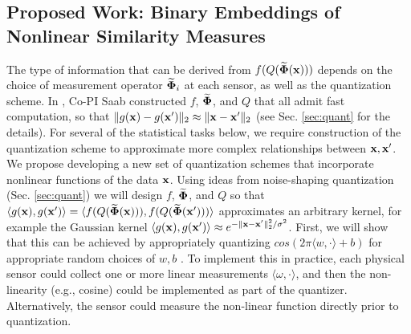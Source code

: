 \subsection{Proposed Work: Binary Embeddings of Nonlinear Similarity Measures}
The type of information that can be derived from $f(Q(\widetilde{\mathbf{\Phi}} (\mathbf{x})))$ depends on
the choice of measurement operator $\widetilde{\mathbf{\Phi}}_i$ at each sensor, as well as
the quantization scheme.  In \cite{huynh2018fast}, Co-PI Saab constructed $f$, $\widetilde{\mathbf{\Phi}}$, and $Q$ that all admit fast computation, so that 
$\|g(\mathbf{x}) - g(\mathbf{x}')\|_2\approx \|\mathbf{x}-\mathbf{x}'\|_2$  (see Sec. \ref{sec:quant} for the details).  For several of the statistical tasks below, we require construction of the quantization scheme to approximate more complex relationships between $\mathbf{x},\mathbf{x}'$.  We propose developing a new set of quantization schemes that incorporate nonlinear functions of the data $\mathbf{x}$. Using ideas from noise-shaping quantization (Sec. \ref{sec:quant}) we will design 
$f$, $\widetilde{\mathbf{\Phi}}$, and $Q$ so that $\langle g(\mathbf{x}), g(\mathbf{x}') \rangle = \langle f(Q(\widetilde{\mathbf{\Phi}} (\mathbf{x}))), f(Q(\widetilde{\mathbf{\Phi}} (\mathbf{x}')))\rangle$
approximates an arbitrary kernel, for example the Gaussian kernel $\langle g(\mathbf{x}), g(\mathbf{x}') \rangle \approx
e^{-\|\mathbf{x}-\mathbf{x}'\|_2^2/\sigma^2}$.  First, we will show that this
can be achieved by appropriately quantizing $cos(2\pi \langle w, \cdot
\rangle+b)$ for appropriate random choices of $w,b$ \cite{rahimi2008random}. To
implement this in practice, each physical sensor could collect one or
more linear measurements $\langle \omega, \cdot \rangle$, and then the
non-linearity (e.g., cosine) could be implemented as part of the
quantizer. Alternatively, the sensor could measure the non-linear
function directly prior to quantization.
%

